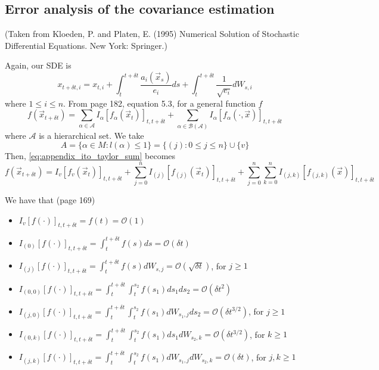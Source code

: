 \documentclass[12pt]{article}
\begin{document}
\subsection{Error analysis of the covariance estimation}


(Taken from Kloeden, P. and Platen, E. (1995) Numerical Solution of Stochastic Differential Equations. New York: Springer.)

Again, our SDE is
\begin{equation}
x_{t + \delta t, i} = x_{t, i} + \int_{t}^{t + \delta t} \frac{a_i(\vec{x}_s)}{e_i} ds + \int_{t}^{t+\delta t} \frac{1}{\sqrt{e_i}} dW_{s, i}
\end{equation}
where $1 \le i \le n$. 
%
From page 182, equation 5.3, for a general function $f$
%
\begin{equation} \label{eq:appendix_ito_taylor_sum}
f(\vec{x}_{t+\delta t}) = \sum_{\alpha \in \mathcal{A}} I_\alpha[f_\alpha (\vec{x}_t)]_{t, t+\delta t} + \sum_{\alpha \in \mathcal{B}(\mathcal{A})} I_\alpha [f_\alpha(\cdot, \vec{x})]_{t, t+\delta t}
\end{equation}
where $\mathcal{A}$ is a hierarchical set. 
%
We take 
\begin{equation}
 A = \{ \alpha \in M : l(\alpha) \le 1 \} = \{ (j) : 0 \le j \le n \} \cup \{v \}
\end{equation}
%
Then, \eqref{eq:appendix_ito_taylor_sum} becomes
\begin{equation} 
f(\vec{x}_{t+\delta t}) = I_{v} [f_v(\vec{x}_t)]_{t, t+\delta t} + \sum_{j=0}^n I_{(j)} [f_{(j)}(\vec{x}_t)]_{t, t+\delta t} + \sum_{j=0}^n \sum_{k=0}^n I_{(j,k)} [f_{(j,k)} ( \vec{x} )]_{t, t+\delta t}
\end{equation}

We have that (page 169)
\begin{itemize}
\item $I_v [f(\cdot)]_{t, t + \delta t} = f(t) = \mathcal{O}(1)$
\item $I_{(0)} [f(\cdot)]_{t, t + \delta t} = \int_{t}^{t + \delta t} f(s) ds = \mathcal{O}(\delta t)$
\item $I_{(j)} [f(\cdot)]_{t, t + \delta t} = \int_{t}^{t + \delta t} f(s) dW_{s,j} = \mathcal{O}(\sqrt{\delta t})$, for $j \ge 1$
\item $I_{(0,0)} [f(\cdot)]_{t, t + \delta t} = \int_{t}^{t + \delta t} \int_{t}^{s_2} f(s_1) ds_1 ds_2 = \mathcal{O}(\delta t^2)$
\item $I_{(j,0)} [f(\cdot)]_{t, t + \delta t} = \int_{t}^{t + \delta t} \int_{t}^{s_2} f(s_1) dW_{s_1, j} ds_2 = \mathcal{O}(\delta t^{3/2})$, for $j \ge 1$
\item $I_{(0,k)} [f(\cdot)]_{t, t + \delta t} = \int_{t}^{t + \delta t} \int_{t}^{s_2} f(s_1) ds_1 dW_{s_2, k} = \mathcal{O}(\delta t^{3/2})$, for $k \ge 1$
\item $I_{(j,k)} [f(\cdot)]_{t, t + \delta t} = \int_{t}^{t + \delta t} \int_{t}^{s_2} f(s_1) dW_{s_1, j} dW_{s_2, k} = \mathcal{O}(\delta t)$, for $j, k \ge 1$
\end{itemize}
\end{document}
